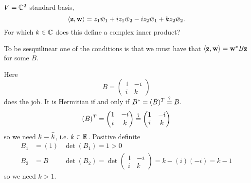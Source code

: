 \documentclass[10pt, a4paper]{article}
\begin{document}
\begin{problem}
    $V = \mathbb{C} ^ 2$ standard basis,
    \[
    \langle\mathbf{z}, \mathbf{w}\rangle = z_1\Bar{w}_1 + iz_1\Bar{w}_2 - iz_2\Bar{w}_1 + kz_2\Bar{w}_2.
    \]
    For which $k \in \mathbb{C}$ does this define a complex inner product?

    \begin{solution}
        To be sesquilinear one of the conditions is that we must have that $\langle\mathbf{z}, \mathbf{w}\rangle = \mathbf{w} ^ {*}B\mathbf{z}$ for some $B$.

        Here
        \[
        B = \begin{pmatrix}
            1 & -i \\
            i & k
        \end{pmatrix}
        \]
        does the job.
        It is Hermitian if and only if $B ^ {*} = (\Bar{B}) ^ T \overset{?}{=} B$.
        \[
        (\Bar{B}) ^ T = \begin{pmatrix}
            1 & -i \\ i & \bar{k}
        \end{pmatrix} \overset{?}{=} \begin{pmatrix}
            1 & -i \\ i & k
        \end{pmatrix}
        \]
        so we need $k = \Bar{k}$,
        i.e. $k \in \mathbb{R}$.
        Positive definite
        \begin{align*}
            B_1 &= (1)&\det(B_1) = 1 > 0 \\
            B_2 &= B&\det(B_2) = \det\begin{pmatrix}
                1 & -i \\ i & k
            \end{pmatrix} = k - (i)(-i) = k - 1
        \end{align*}
        so we need $k > 1$.
        \[
        \]
        
    \end{solution}
\end{problem}
\end{document}

